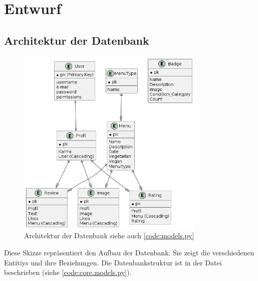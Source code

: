 \chapter{Entwurf} \label{chap:entwurf}
\section{Architektur der Datenbank} \label{sec:DB}
\begin{figure}[ht]
    \centering
    \includegraphics[width=0.8\textwidth]{images/Database.png}
    \caption{Architektur der Datenbank siehe auch \ref{code:models.py}}
    \label{fig:DB}
\end{figure}

Diese Skizze repräsentiert den Aufbau der Datenbank. Sie zeigt die verschiedenen
Entitiys und ihre Beziehungen. Die Datenbankstruktur ist in der Datei
 beschrieben (siehe \ref{code:core.models.py}).
